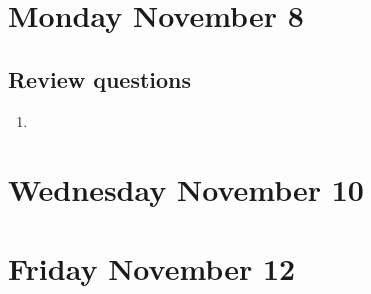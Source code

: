 

\section*{Monday November 8}





\subsection*{Review questions}
\begin{enumerate}
\item 
\end{enumerate}

\newpage
\section*{Wednesday November 10}



\newpage
\section*{Friday November 12}







